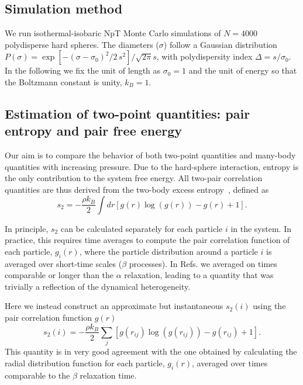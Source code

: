 \documentclass[twocolumn,superscriptaddress]{revtex4}
\begin{document}
\subsection{Simulation method}
We run isothermal-isobaric NpT Monte Carlo simulations of $N=4000$ polydisperse hard spheres.
The diameters ($\sigma$) follow a Gaussian distribution $P(\sigma)=\exp{\left[-(\sigma-\sigma_0)^2/2\,s^2\right]}/\sqrt{2\pi} s$,
with polydispersity index $\Delta=s/\sigma_0$. In the following we fix the unit of length as $\sigma_0=1$ and the unit
of energy so that the Boltzmann constant is unity, $k_B=1$.

\subsection{Estimation of two-point quantities: pair entropy and pair free energy}
Our aim is to compare the behavior of both two-point quantities and many-body quantities with increasing pressure.
Due to the hard-sphere interaction, entropy is the only contribution to the system free energy.
All two-pair correlation quantities are thus derived from the two-body excess entropy~\cite{Nettleton1958,Mountain1971},
defined as
\begin{equation}
s_2=-\frac{\rho k_B}{2}\int dr\left[g(r)\log(g(r))-g(r)+1\right]. 
\end{equation}

In principle, $s_2$ can be calculated separately for each particle $i$ in the system. In practice, this requires time averages to compute the pair correlation function of each particle, $g_i(r)$, where the particle distribution around a particle $i$ is averaged over short-time scales ($\beta$ processes). In Refs. \cite{tanaka,watanabe_walls,KawasakiJPCM} we averaged on times comparable or longer than the $\alpha$ relaxation, leading to a quantity that was trivially a reflection of the dynamical heterogeneity. 

Here we instead construct an approximate but instantaneous $s_2(i)$ using the pair correlation function $g(r)$
\begin{equation}
s_2(i) = -\frac{\rho k_B}{2}\sum_j \left[g(r_{ij})\log(g(r_{ij}))-g(r_{ij})+1\right].
\end{equation}
This quantity is in very good agreement with the one obtained by calculating the radial distribution function for each
particle, $g_i(r)$, averaged over times comparable to the $\beta$ relaxation time.
\end{document}

